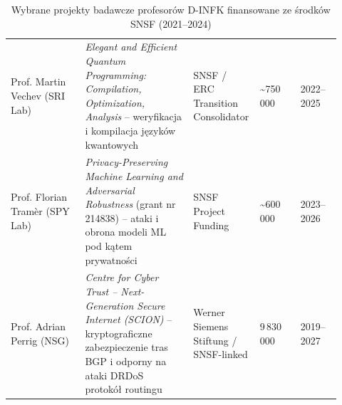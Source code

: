 \begin{table}[H]
    \centering
    \caption{Wybrane projekty badawcze profesorów D-INFK finansowane ze środków SNSF (2021--2024)}\label{tab:granty-snsf}
    \tablefont
    \begin{tabularx}{\linewidth}{L{0.22\linewidth} L{0.32\linewidth} C{0.14\linewidth} C{0.12\linewidth} L{0.12\linewidth}}
        \toprule
         &  &  &  &  \\
        \midrule
        Prof. Martin Vechev (SRI Lab) & \textit{Elegant and Efficient Quantum Programming: Compilation, Optimization, Analysis} -- weryfikacja i kompilacja języków kwantowych & SNSF / ERC Transition Consolidator & \textasciitilde{}750\,000 & 2022--2025 \\
        Prof. Florian Tramèr (SPY Lab) & \textit{Privacy-Preserving Machine Learning and Adversarial Robustness} (grant nr 214838) -- ataki i obrona modeli ML pod kątem prywatności & SNSF Project Funding & \textasciitilde{}600\,000 & 2023--2026 \\
        Prof. Adrian Perrig (NSG) & \textit{Centre for Cyber Trust -- Next-Generation Secure Internet (SCION)} -- kryptograficzne zabezpieczenie tras BGP i odporny na ataki DRDoS protokół routingu & Werner Siemens Stiftung / SNSF-linked & 9\,830\,000 & 2019--2027 \\
        \bottomrule
    \end{tabularx}
\end{table}


